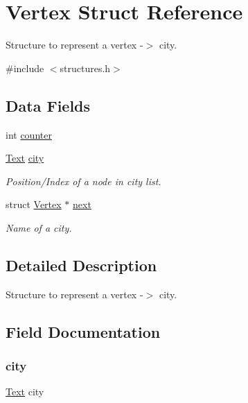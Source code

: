 \hypertarget{struct_vertex}{}\section{Vertex Struct Reference}
\label{struct_vertex}


Structure to represent a vertex -\/$>$ city.  




{\ttfamily \#include $<$structures.\+h$>$}

\subsection*{Data Fields}
\begin{DoxyCompactItemize}
\item 
int \mbox{\hyperlink{struct_vertex_a617a47c70795bcff659815ad0efd2266}{counter}}
\item 
\mbox{\hyperlink{structures_8h_a40c368b38c251b762d65bf9a9703c4b0}{Text}} \mbox{\hyperlink{struct_vertex_a1d55ae4dbf7624aecfac40f75a6441a5}{city}}
\begin{DoxyCompactList}\small\item\em Position/\+Index of a node in city list. \end{DoxyCompactList}\item 
struct \mbox{\hyperlink{struct_vertex}{Vertex}} $\ast$ \mbox{\hyperlink{struct_vertex_ad959a48c566626429c5091adfbd48bac}{next}}
\begin{DoxyCompactList}\small\item\em Name of a city. \end{DoxyCompactList}\end{DoxyCompactItemize}


\subsection{Detailed Description}
Structure to represent a vertex -\/$>$ city. 

\subsection{Field Documentation}
\mbox{\label{struct_vertex_a1d55ae4dbf7624aecfac40f75a6441a5}} 
\subsubsection{\texorpdfstring{city}{city}}
{\footnotesize\ttfamily \mbox{\hyperlink{structures_8h_a40c368b38c251b762d65bf9a9703c4b0}{Text}} city}




